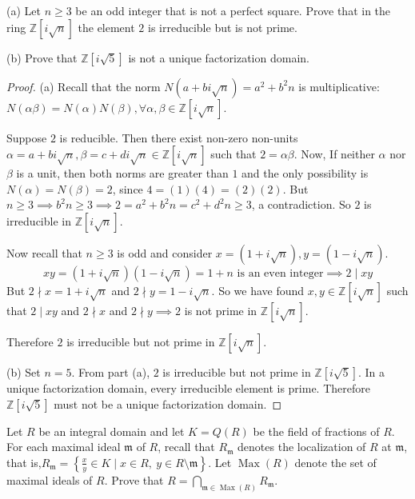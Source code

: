 \documentclass[addpoints,10pt]{exam}
\theoremstyle{plain}
\theoremstyle{definition}
\newtheorem{prob}[thm]{Problem}
\theoremstyle{plain}
\theoremstyle{plain}
\theoremstyle{definition}
\let\oldprob\prob
\let\endoldprob\endprob
\renewenvironment{prob}
  {\begin{singlespace}\oldprob}
  {\endoldprob\end{singlespace}}
\newcommand{\ZZ}{\ensuremath{\mathbb{Z}}}
\begin{document}
\setcounter{thm}{0} %
\begin{prob}
(a) Let $n \geq 3$ be an odd integer that is not a perfect square. Prove that in the ring $\mathbb{Z}[i\sqrt{n}]$ the element $2$ is irreducible but is not prime.

(b) Prove that $\mathbb{Z}[i\sqrt{5}]$ is not a unique factorization domain.
\end{prob}
\begin{proof}
(a) Recall that the norm $N(a+bi\sqrt{n})=a^{2}+b^{2}n$ is multiplicative: $N(\alpha\beta)=N(\alpha)N(\beta),\forall \alpha,\beta\in \ZZ[i\sqrt{n}]$.

Suppose $2$ is reducible. Then there exist non-zero non-units $\alpha=a+bi\sqrt{n},\beta=c+di\sqrt{n}\in \ZZ[i\sqrt{n}]$ such that $2=\alpha\beta$. Now, If neither $\alpha$ nor $\beta$ is a unit, then both norms are greater than $1$ and the only possibility is
$N(\alpha)=N(\beta)=2$, since $4=(1)(4)=(2)(2).$ But $n\geq 3\implies b^{2}n\geq 3\implies 2=a^{2}+b^{2}n=c^{2}+d^{2}n\geq 3$, a contradiction. So $2$ is irreducible in $\ZZ[i\sqrt{n}]$. 

Now recall that $n\geq 3$ is odd and consider $x=(1+i\sqrt{n}),y=(1-i\sqrt{n})$.
$$
xy=(1+i\sqrt{n})(1-i\sqrt{n})=1+n\text{ is an even integer}\implies 2\mid xy
$$
But $2\nmid x=1+i\sqrt{n}$ and $2\nmid y= 1-i\sqrt{n}$. So we have found $x,y\in \ZZ[i\sqrt{n}]$ such that $2\mid xy$ and $2\nmid x$ and $2\nmid y\implies 2$ is not prime in $\ZZ[i\sqrt{n}].$

Therefore $2$ is irreducible but not prime in $\mathbb{Z}[i\sqrt{n}]$.

(b) Set $n=5$. From part (a), $2$ is irreducible but not prime in $\mathbb{Z}[i\sqrt{5}]$. In a unique factorization domain, every irreducible element is prime. Therefore $\mathbb{Z}[i\sqrt{5}]$ must not be a unique factorization domain.
\end{proof}
\newpage
\begin{prob}
Let $R$ be an integral domain and let $K = Q(R)$ be the field of fractions of $R$. For each maximal ideal $\mathfrak{m}$ of $R$, recall that $R_{\mathfrak{m}}$ denotes the localization of $R$ at $\mathfrak{m}$, that is,$R_{\mathfrak{m}}=\left\{\frac{x}{y}\in K \mid x\in R,\ y\in R\setminus \mathfrak{m} \right\}.$
Let $\operatorname{Max}(R)$ denote the set of maximal ideals of $R$. Prove that
$R=\bigcap_{\mathfrak{m}\in \operatorname{Max}(R)} R_{\mathfrak{m}}.$
\end{prob}
\end{document}
